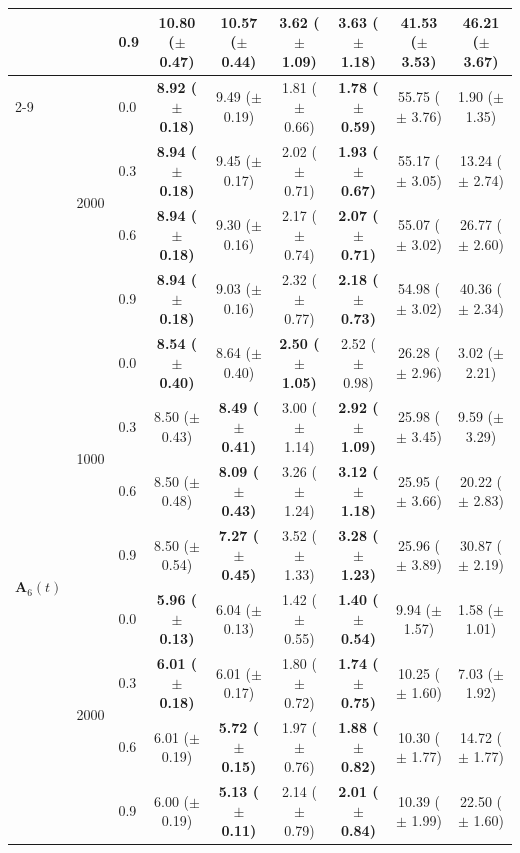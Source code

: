 \begin{table}[htbp]
{\begin{tabular}{lll|cc|cc|cc}
 &  & 0.9 & 10.80 ($\pm$ 0.47) & \textbf{10.57 ($\pm$ 0.44)} & \textbf{3.62 ($\pm$ 1.09)} & 3.63 ($\pm$ 1.18) & 41.53 ($\pm$ 3.53) & 46.21 ($\pm$ 3.67) \\
\cline{2-9}
 & \multirow{4}{*}{2000} & 0.0 & \textbf{8.92 ($\pm$ 0.18)} & 9.49 ($\pm$ 0.19) & 1.81 ($\pm$ 0.66) & \textbf{1.78 ($\pm$ 0.59)} & 55.75 ($\pm$ 3.76) & 1.90 ($\pm$ 1.35) \\
 &  & 0.3 & \textbf{8.94 ($\pm$ 0.18)} & 9.45 ($\pm$ 0.17) & 2.02 ($\pm$ 0.71) & \textbf{1.93 ($\pm$ 0.67)} & 55.17 ($\pm$ 3.05) & 13.24 ($\pm$ 2.74) \\
 &  & 0.6 & \textbf{8.94 ($\pm$ 0.18)} & 9.30 ($\pm$ 0.16) & 2.17 ($\pm$ 0.74) & \textbf{2.07 ($\pm$ 0.71)} & 55.07 ($\pm$ 3.02) & 26.77 ($\pm$ 2.60) \\
 &  & 0.9 & \textbf{8.94 ($\pm$ 0.18)} & 9.03 ($\pm$ 0.16) & 2.32 ($\pm$ 0.77) & \textbf{2.18 ($\pm$ 0.73)} & 54.98 ($\pm$ 3.02) & 40.36 ($\pm$ 2.34) \\
\hline
\multirow{8}{*}{$\mathbf{A}_6(t)$} & \multirow{4}{*}{1000} & 0.0 & \textbf{8.54 ($\pm$ 0.40)} & 8.64 ($\pm$ 0.40) & \textbf{2.50 ($\pm$ 1.05)} & 2.52 ($\pm$ 0.98) & 26.28 ($\pm$ 2.96) & 3.02 ($\pm$ 2.21) \\
 &  & 0.3 & 8.50 ($\pm$ 0.43) & \textbf{8.49 ($\pm$ 0.41)} & 3.00 ($\pm$ 1.14) & \textbf{2.92 ($\pm$ 1.09)} & 25.98 ($\pm$ 3.45) & 9.59 ($\pm$ 3.29) \\
 &  & 0.6 & 8.50 ($\pm$ 0.48) & \textbf{8.09 ($\pm$ 0.43)} & 3.26 ($\pm$ 1.24) & \textbf{3.12 ($\pm$ 1.18)} & 25.95 ($\pm$ 3.66) & 20.22 ($\pm$ 2.83) \\
 &  & 0.9 & 8.50 ($\pm$ 0.54) & \textbf{7.27 ($\pm$ 0.45)} & 3.52 ($\pm$ 1.33) & \textbf{3.28 ($\pm$ 1.23)} & 25.96 ($\pm$ 3.89) & 30.87 ($\pm$ 2.19) \\
\cline{2-9}
 & \multirow{4}{*}{2000} & 0.0 & \textbf{5.96 ($\pm$ 0.13)} & 6.04 ($\pm$ 0.13) & 1.42 ($\pm$ 0.55) & \textbf{1.40 ($\pm$ 0.54)} & 9.94 ($\pm$ 1.57) & 1.58 ($\pm$ 1.01) \\
 &  & 0.3 & \textbf{6.01 ($\pm$ 0.18)} & 6.01 ($\pm$ 0.17) & 1.80 ($\pm$ 0.72) & \textbf{1.74 ($\pm$ 0.75)} & 10.25 ($\pm$ 1.60) & 7.03 ($\pm$ 1.92) \\
 &  & 0.6 & 6.01 ($\pm$ 0.19) & \textbf{5.72 ($\pm$ 0.15)} & 1.97 ($\pm$ 0.76) & \textbf{1.88 ($\pm$ 0.82)} & 10.30 ($\pm$ 1.77) & 14.72 ($\pm$ 1.77) \\
 &  & 0.9 & 6.00 ($\pm$ 0.19) & \textbf{5.13 ($\pm$ 0.11)} & 2.14 ($\pm$ 0.79) & \textbf{2.01 ($\pm$ 0.84)} & 10.39 ($\pm$ 1.99) & 22.50 ($\pm$ 1.60) \\
\hline
\end{tabular}%
}
\end{table}

